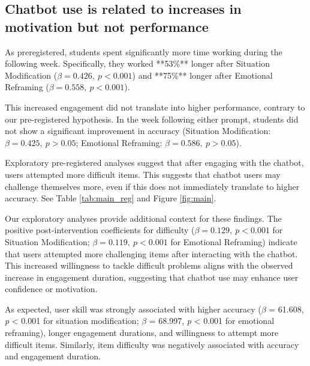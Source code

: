 \documentclass[11pt]{report}
\begin{document}
\begin{mainf}
\subsection{Chatbot use is related to increases in motivation but not performance}

As preregistered, students spent significantly more time working during the following week. 
Specifically, they worked **53\%** longer after Situation Modification (\(\beta=0.426,\ p<0.001\)) and **75\%** longer after Emotional Reframing (\(\beta=0.558,\ p<0.001\)).

This increased engagement did not translate into higher performance, contrary to our pre-registered hypothesis. 
In the week following either prompt, students did not show a significant improvement in accuracy (Situation Modification: \(\beta=0.425,\ p>0.05\); Emotional Reframing: \(\beta=0.586,\ p>0.05\)).

Exploratory pre-registered analyses suggest that after engaging with the chatbot, users attempted more difficult items. 
This suggests that chatbot users may challenge themselves more, even if this does not immediately translate to higher accuracy. See Table \ref{tab:main_reg} and Figure \ref{fig:main}.

Our exploratory analyses provide additional context for these findings. 
The positive post-intervention coefficients for difficulty (\(\beta=0.129,\ p<0.001\) for Situation Modification; \(\beta=0.119,\ p<0.001\) for Emotional Reframing) indicate that users attempted more challenging items after interacting with the chatbot. 
This increased willingness to tackle difficult problems aligns with the observed increase in engagement duration, suggesting that chatbot use may enhance user confidence or motivation.

As expected, user skill was strongly associated with higher accuracy ($\beta$ = 61.608, \textit{p} < 0.001 for situation modification; $\beta$ = 68.997, \textit{p} < 0.001 for emotional reframing), longer engagement durations, and willingness to attempt more difficult items. 
Similarly, item difficulty was negatively associated with accuracy and engagement duration.


\end{mainf}
\end{document}
